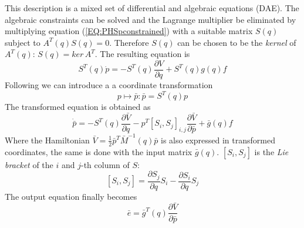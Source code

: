 \documentclass[a4paper,twoside, openright,12pt]{report}
\begin{document}
This description is a mixed set of differential and algebraic equations (DAE). The algebraic constraints can be solved and the Lagrange multiplier be eliminated by multiplying equation (\ref{EQ:PHSpconstrained}) with a suitable matrix $S(q)$ subject to $A^T(q)S(q) = 0$. Therefore $S(q)$ can be chosen to be the \emph{kernel} of $A^T(q)$: $S(q) = ker \, A^T$.
The resulting equation is
\[S^T(q)\dot{p} = -S^T(q)\frac{\partial V}{\partial q} +S^T(q)g(q)f \]
Following \cite{Schaft_13} we can introduce a a coordinate transformation 
\begin{equation}\label{EQ:cooordtransmom}p \mapsto \bar{p}: \bar{p} = S^T(q)p \end{equation}
The transformed equation is obtained as
\[\dot{\bar{p}} = -S^T(q)\frac{\partial \bar{V}}{\partial q} -p^T [S_i,S_j]_{i,j} \frac{\partial \bar{V}}{\partial \bar{p}} + \bar{g}(q)f \]
Where the Hamiltonian $\bar{V} = \frac{1}{2}\bar{p}^T\bar{M}^{-1}(q)\bar{p}$ is also expressed in transformed coordinates, the same is done with the input matrix $\bar{g}(q)$. $ [S_i,S_j] $ is the \emph{Lie bracket} of the $i$ and $j$-th column of $S$:
\[[S_i,S_j] = \frac{\partial S_j}{\partial q}S_i - \frac{\partial S_i}{\partial q}S_j\] The output equation finally becomes 
\[ \bar{e} = \bar{g}^T(q) \frac{\partial \bar{V}}{\partial \bar{p}} \]
\end{document}
